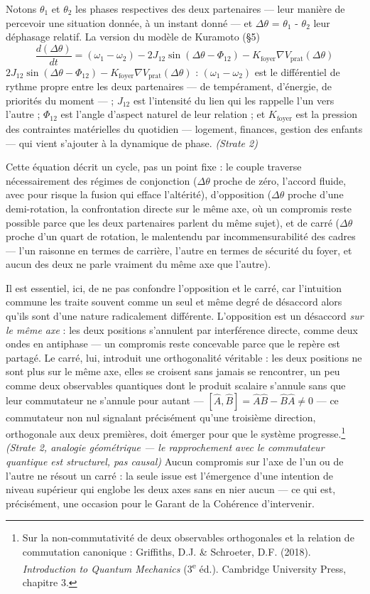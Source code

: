 \documentclass[french, 11pt, twoside, openright, a5paper]{book}
\begin{document}
Notons $\theta_1$ et $\theta_2$ les phases respectives des deux partenaires --- leur
manière de percevoir une situation donnée, à un instant donné --- et $\Delta\theta$
= $\theta_1$ - $\theta_2$ leur déphasage relatif. La version du modèle de Kuramoto (§5)
\[ \frac{d(\Delta\theta)}{dt} = (\omega_1 - \omega_2) - 2J_{12} \sin(\Delta\theta - \Phi_{12}) - K_{\text{foyer}} \nabla V_{\text{prat}}(\Delta\theta) \]
$2J_{12} \sin(\Delta\theta - \Phi_{12}) - K_{\text{foyer}} \nabla V_{\text{prat}}(\Delta\theta)$ : $(\omega_1 - \omega_2)$ est le différentiel
de rythme propre entre les deux partenaires --- de tempérament,
d'énergie, de priorités du moment --- ; $J_{12}$ est l'intensité du lien qui
les rappelle l'un vers l'autre ; $\Phi_{12}$ est l'angle d'aspect naturel de
leur relation ; et $K_{\text{foyer}}$ est la pression des contraintes matérielles
du quotidien --- logement, finances, gestion des enfants --- qui vient
s'ajouter à la dynamique de phase. \emph{(Strate 2)}

Cette équation décrit un cycle, pas un point fixe : le couple traverse
nécessairement des régimes de conjonction ($\Delta\theta$ proche de zéro, l'accord
fluide, avec pour risque la fusion qui efface l'altérité), d'opposition
($\Delta\theta$ proche d'une demi-rotation, la confrontation directe sur le même
axe, où un compromis reste possible parce que les deux partenaires
parlent du même sujet), et de carré ($\Delta\theta$ proche d'un quart de rotation,
le malentendu par incommensurabilité des cadres --- l'un raisonne en
termes de carrière, l'autre en termes de sécurité du foyer, et aucun des
deux ne parle vraiment du même axe que l'autre).

Il est essentiel, ici, de ne pas confondre l'opposition et le carré, car
l'intuition commune les traite souvent comme un seul et même degré de
désaccord alors qu'ils sont d'une nature radicalement différente.
L'opposition est un désaccord \emph{sur le même axe} : les deux
positions s'annulent par interférence directe, comme deux ondes en
antiphase --- un compromis reste concevable parce que le repère est
partagé. Le carré, lui, introduit une orthogonalité véritable : les deux
positions ne sont plus sur le même axe, elles se croisent sans jamais se
rencontrer, un peu comme deux observables quantiques dont le produit
scalaire s'annule sans que leur commutateur ne s'annule pour autant ---
$[\hat{A},\hat{B}] = \hat{A}\hat{B} - \hat{B}\hat{A} \neq 0$ --- ce commutateur non nul signalant précisément
qu'une troisième direction, orthogonale aux deux premières, doit émerger
pour que le système progresse.\footnote{Sur la non-commutativité de deux observables orthogonales et la relation de commutation canonique : Griffiths, D.J. \& Schroeter, D.F. (2018). \emph{Introduction to Quantum Mechanics} (3\textsuperscript{e} éd.). Cambridge University Press, chapitre 3.} \emph{(Strate 2, analogie géométrique
--- le rapprochement avec le commutateur quantique est structurel, pas
causal)} Aucun compromis sur l'axe de l'un ou de l'autre ne résout un
carré : la seule issue est l'émergence d'une intention de niveau
supérieur qui englobe les deux axes sans en nier aucun --- ce qui est,
précisément, une occasion pour le Garant de la Cohérence d'intervenir.
\end{document}
